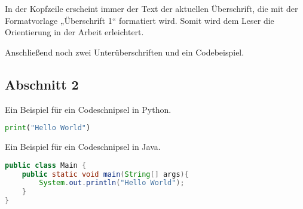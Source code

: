 \documentclass{mi-graduation}
\begin{document}
In der Kopfzeile erscheint immer der Text der aktuellen Überschrift, die mit der Formatvorlage „Überschrift 1“ formatiert wird. Somit wird dem Leser die Orientierung in der Arbeit erleichtert.\\

\begin{figure}[h!]
	\label{img:norman2010}
\end{figure}

Anschließend noch zwei Unterüberschriften und ein Codebeispiel.

\subsection{Abschnitt 2}\label{section:2}
Ein Beispiel für ein Codeschnipsel in Python.\\

\begin{lstlisting}[captionpos=b, belowcaptionskip=4pt, caption=Hello World (Python), label=helloworld, language=Python]
print("Hello World")
\end{lstlisting}

Ein Beispiel für ein Codeschnipsel in Java.\\

\begin{lstlisting}[captionpos=b, belowcaptionskip=4pt, caption=Hello World (Java), language=Java]
public class Main {
	public static void main(String[] args){
		System.out.println("Hello World");
	}
}
\end{lstlisting}

\newpage


\end{document}
